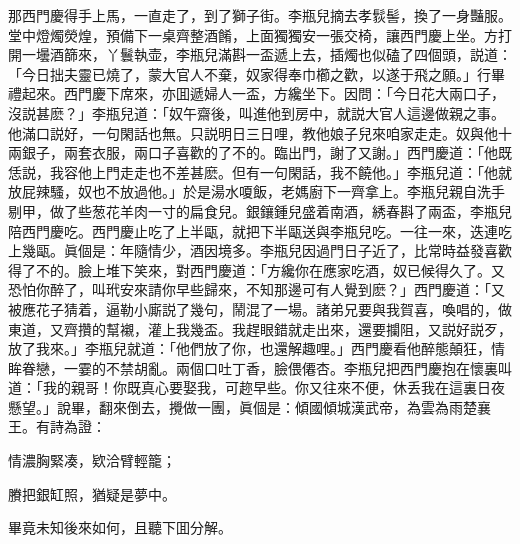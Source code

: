那西門慶得手上馬，一直走了，到了獅子街。李瓶兒摘去孝䯼髻，換了一身豔服。堂中燈燭熒煌，預備下一桌齊整酒餚，上面獨獨安一張交椅，讓西門慶上坐。方打開一壜酒篩來，丫鬟執壶，李瓶兒滿斟一盃遞上去，插燭也似磕了四個頭，説道：「今日拙夫靈已燒了，蒙大官人不棄，奴家得奉巾櫛之歡，以遂于飛之願。」行畢禮起來。西門慶下席來，亦囬遞婦人一盃，方纔坐下。因問：「今日花大兩口子，沒説甚麽？」李瓶兒道：「奴午齋後，叫進他到房中，就説大官人這邊做親之事。他滿口説好，一句閑話也無。只説明日三日哩，教他娘子兒來咱家走走。奴與他十兩銀子，兩套衣服，兩口子喜歡的了不的。臨出門，謝了又謝。」西門慶道：「他既恁説，我容他上門走走也不差甚麽。但有一句閑話，我不饒他。」李瓶兒道：「他就放屁辣騷，奴也不放過他。」於是湯水嗄飯，老媽廚下一齊拿上。李瓶兒親自洗手剔甲，做了些葱花羊肉一寸的扁食兒。銀鑲鍾兒盛着南酒，綉春斟了兩盃，李瓶兒陪西門慶吃。西門慶止吃了上半甌，就把下半甌送與李瓶兒吃。一往一來，迭連吃上幾甌。眞個是：年隨情少，酒因境多。李瓶兒因過門日子近了，比常時益發喜歡得了不的。臉上堆下笑來，對西門慶道：「方纔你在應家吃酒，奴已候得久了。又恐怕你醉了，叫玳安來請你早些歸來，不知那邊可有人覺到麽？」西門慶道：「又被應花子猜着，逼勒小廝説了幾句，鬧混了一場。諸弟兄要與我賀喜，喚唱的，做東道，又齊攢的幫襯，灌上我幾盃。我趕眼錯就走出來，還要攔阻，又説好説歹，放了我來。」李瓶兒就道：「他們放了你，也還解趣哩。」西門慶看他醉態顛狂，情眸眷戀，一霎的不禁胡亂。兩個口吐丁香，臉偎僊杏。李瓶兒把西門慶抱在懷裏叫道：「我的親哥！你既真心要娶我，可趂早些。你又往來不便，休丢我在這裏日夜懸望。」說畢，翻來倒去，攪做一團，眞個是：傾國傾城漢武帝，為雲為雨楚襄王。有詩為證：

情濃胸緊凑，欵洽臂輕籠；

賸把銀缸照，猶疑是夢中。

畢竟未知後來如何，且聽下囬分解。

